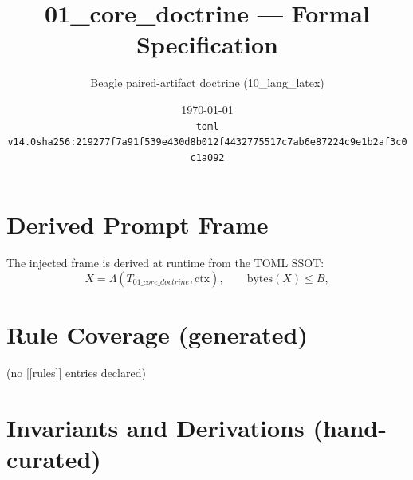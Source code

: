 \documentclass[11pt]{article}
\title{01\_core\_doctrine --- Formal Specification}
\author{Beagle paired-artifact doctrine (10\_lang\_latex)}
\date{\today\\ \texttt{toml v14.0\quad sha256:219277f7a91f539e430d8b012f4432775517c7ab6e87224c9e1b2af3c0c1a092}}
\begin{document}
\maketitle

\section{Derived Prompt Frame}
The injected frame is derived at runtime from the TOML SSOT:
\begin{equation}
  X = \Lambda(T_{01\_core\_doctrine}, \mathrm{ctx}), \qquad \mathrm{bytes}(X) \le B,
  \label{lbl:derive-frame}
\end{equation}

\section{Rule Coverage (generated)}
(no [[rules]] entries declared)

\section{Invariants and Derivations (hand-curated)}
\end{document}
